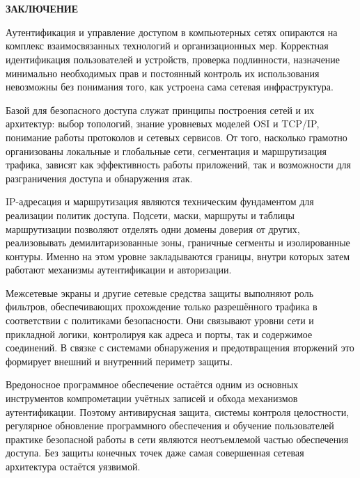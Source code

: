 \documentclass{SibFU-docs}
\begin{document}
\newpage
\section*{}
\vspace*{-2.5em}
\begin{center}\textbf{ЗАКЛЮЧЕНИЕ}\end{center}
{}

Аутентификация и управление доступом в компьютерных сетях опираются на комплекс взаимосвязанных технологий и организационных мер. Корректная идентификация пользователей и устройств, проверка подлинности, назначение минимально необходимых прав и постоянный контроль их использования невозможны без понимания того, как устроена сама сетевая инфраструктура.

Базой для безопасного доступа служат принципы построения сетей и их архитектур: выбор топологий, знание уровневых моделей OSI и TCP/IP, понимание работы протоколов и сетевых сервисов. От того, насколько грамотно организованы локальные и глобальные сети, сегментация и маршрутизация трафика, зависят как эффективность работы приложений, так и возможности для разграничения доступа и обнаружения атак.

IP-адресация и маршрутизация являются техническим фундаментом для реализации политик доступа. Подсети, маски, маршруты и таблицы маршрутизации позволяют отделять одни домены доверия от других, реализовывать демилитаризованные зоны, граничные сегменты и изолированные контуры. Именно на этом уровне закладываются границы, внутри которых затем работают механизмы аутентификации и авторизации.

Межсетевые экраны и другие сетевые средства защиты выполняют роль фильтров, обеспечивающих прохождение только разрешённого трафика в соответствии с политиками безопасности. Они связывают уровни сети и прикладной логики, контролируя как адреса и порты, так и содержимое соединений. В связке с системами обнаружения и предотвращения вторжений это формирует внешний и внутренний периметр защиты.

Вредоносное программное обеспечение остаётся одним из основных инструментов компрометации учётных записей и обхода механизмов аутентификации. Поэтому антивирусная защита, системы контроля целостности, регулярное обновление программного обеспечения и обучение пользователей практике безопасной работы в сети являются неотъемлемой частью обеспечения доступа. Без защиты конечных точек даже самая совершенная сетевая архитектура остаётся уязвимой.
\end{document}
